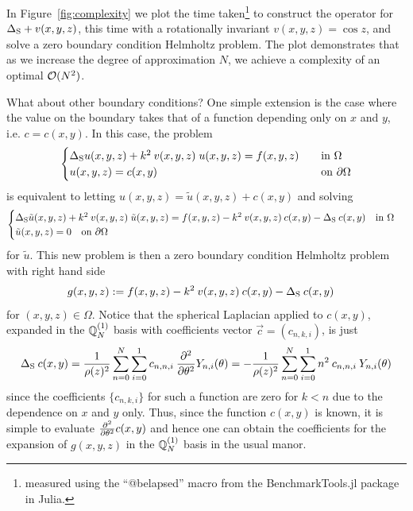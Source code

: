\documentclass[11pt, oneside]{article}   	%
\begin{document}
In Figure~\ref{fig:complexity} we plot the time taken\footnote{measured using the \enquote{@belapsed} macro from the BenchmarkTools.jl package \cite{BenchmarkTools.jl-2016} in Julia.}  to construct the operator for $\Delta_{\rm S} + v(x,y,z)$, this time with a rotationally invariant $v(x,y,z) = \cos z$, and solve a zero boundary condition Helmholtz problem. The plot demonstrates that as we increase the degree of approximation $N$, we achieve a complexity of an optimal $\mathcal{O}(N^2)$.

What about other boundary conditions? One simple extension is the case where the value on the boundary takes that of a function depending only on $x$ and $y$, i.e. $c = c(x,y)$. In this case, the problem
\begin{align*}
	\begin{cases}
    		\Delta_{\rm S} u(x,y,z) + k^2 \: v(x,y,z) \; u(x,y,z) = f(x,y,z) &\quad \text{in } \Omega \\
		u(x,y,z) = c(x,y) &\quad \text{on } \partial \Omega
	\end{cases}
\end{align*}
is equivalent to letting $u(x,y,z) = \tilde{u}(x,y,z)+ c(x,y)$ and solving
\begin{align*}
	\begin{cases}
    		\Delta_{\rm S} \tilde{u}(x,y,z) + k^2 \: v(x,y,z) \; \tilde{u}(x,y,z) = f(x,y,z) - k^2 \: v(x,y,z) \: c(x,y) - \Delta_{\rm S} \: c(x,y)  \quad \text{in } \Omega \\
		\tilde{u}(x,y,z) = 0 \quad \text{on } \partial \Omega
	\end{cases}
\end{align*}
for $\tilde u$. This new problem is then a zero boundary condition Helmholtz problem with right hand side 
\begin{align*}
	g(x,y,z) &:= f(x,y,z) - k^2 \: v(x,y,z) \: c(x,y) - \Delta_{\rm S} \: c(x,y)
\end{align*}
for $(x,y,z) \in \Omega$. Notice that the spherical Laplacian applied to $c(x,y)$, expanded in the ${\mathbb{Q}}_{N}^{(1)}$ basis with coefficients vector $\vec c = (c_{n,k,i})$, is just
\begin{align*}
	\Delta_{\rm S} \: c(x,y) = {1 \over \rho(z)^2} \sum_{n=0}^N \sum_{i=0}^1 c_{n,n,i} \: {\partial^{2} \over \partial {\theta}^{2}} Y_{n,i}(\theta) = - {1 \over \rho(z)^2} \sum_{n=0}^N \sum_{i=0}^1 n^2 \: c_{n,n,i} \: Y_{n,i}(\theta)
\end{align*}
since the coefficients $\{c_{n,k,i}\}$ for such a function are zero for $k < n$ due to the dependence on $x$ and $y$ only. Thus, since the function $c(x,y)$ is known, it is simple to evaluate ${\partial^{2} \over \partial {\theta}^{2}} c(x,y)$ and hence one can obtain the coefficients for the expansion of $g(x,y,z)$ in the ${\mathbb{Q}}_{N}^{(1)}$ basis in the usual manor.
\end{document}
